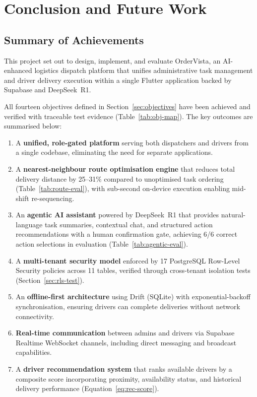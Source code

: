 ﻿%
\chapter{Conclusion and Future Work}
\label{ch:conclusion}

\section{Summary of Achievements}
\label{sec:conc-summary}

This project set out to design, implement, and evaluate OrderVista, an
AI-enhanced logistics dispatch platform that unifies administrative task
management and driver delivery execution within a single Flutter application
backed by Supabase and DeepSeek~R1.

All fourteen objectives defined in Section~\ref{sec:objectives} have been
achieved and verified with traceable test evidence
(Table~\ref{tab:obj-map}).  The key outcomes are summarised below:

\begin{enumerate}
  \item A \textbf{unified, role-gated platform} serving both dispatchers and
        drivers from a single codebase, eliminating the need for separate
        applications.
  \item A \textbf{nearest-neighbour route optimisation engine} that reduces
        total delivery distance by 25--31\% compared to unoptimised task
        ordering (Table~\ref{tab:route-eval}), with sub-second on-device
        execution enabling mid-shift re-sequencing.
  \item An \textbf{agentic AI assistant} powered by DeepSeek~R1 that
        provides natural-language task summaries, contextual chat, and
        structured action recommendations with a human confirmation gate,
        achieving 6/6 correct action selections in evaluation
        (Table~\ref{tab:agentic-eval}).
  \item A \textbf{multi-tenant security model} enforced by 17 PostgreSQL
        Row-Level Security policies across 11 tables, verified through
        cross-tenant isolation tests (Section~\ref{sec:rls-test}).
  \item An \textbf{offline-first architecture} using Drift (SQLite) with
        exponential-backoff synchronisation, ensuring drivers can complete
        deliveries without network connectivity.
  \item \textbf{Real-time communication} between admins and drivers via
        Supabase Realtime WebSocket channels, including direct messaging
        and broadcast capabilities.
  \item A \textbf{driver recommendation system} that ranks available
        drivers by a composite score incorporating proximity, availability
        status, and historical delivery performance
        (Equation~\ref{eq:rec-score}).
\end{enumerate}

